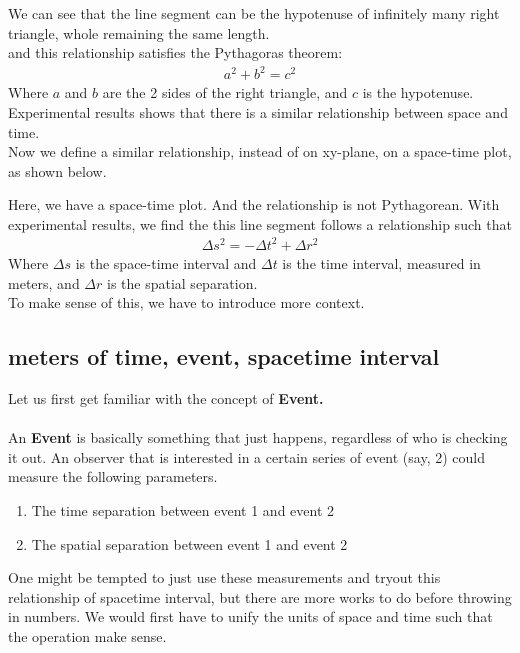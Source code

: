 \documentclass[11pt,letterpaper]{book}
\begin{document}
We can see that the line segment can be the hypotenuse of infinitely many right triangle, whole remaining the same length.\\
and this relationship satisfies the Pythagoras theorem:
\begin{align}
a^2+b^2=c^2
\end{align}
Where $a$ and $b$ are the 2 sides of the right triangle, and $c$ is the hypotenuse.\\
Experimental results shows that there is a similar relationship between space and time.\\
Now we define a similar relationship, instead of on xy-plane, on a space-time plot, as shown below. 
\begin{center}
\end{center}
Here, we have a space-time plot. And the relationship is not Pythagorean. With experimental results, we find the this line segment follows a relationship such that
\begin{align}
\Delta s^2=-\Delta t^2 + \Delta r^2
\end{align}
Where $\Delta s$ is the space-time interval and $\Delta t$ is the time interval, measured in meters, and $\Delta r$ is the spatial separation.\\
To make sense of this, we have to introduce more context.
\subsection{meters of time, event, spacetime interval}
Let us first get familiar with the concept of \textbf{Event.}\\\\
An \textbf{Event} is basically something that just happens, regardless of who is checking it out. An observer that is interested in a certain series of event (say, 2) could measure the following parameters. 
\begin{enumerate}
    \item The time separation between event 1 and event 2
    \item The spatial separation between event 1 and event 2
\end{enumerate}
One might be tempted to just use these measurements and tryout this relationship of spacetime interval, but there are more works to do before throwing in numbers. We would first have to unify the units of space and time such that the operation make sense.\\
\end{document}
